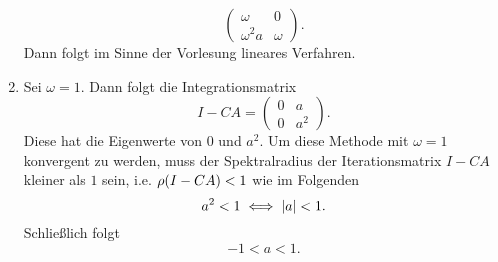\documentclass{exercise}
\begin{document}
\begin{enumerate}
\[\begin{pmatrix}
                \omega & 0\\
                \omega^2 a & \omega
            \end{pmatrix}.
        \]
        Dann folgt im Sinne der Vorlesung lineares Verfahren.
        \item Sei \(\omega = 1\).
        Dann folgt die Integrationsmatrix
        \[
            I - CA = \begin{pmatrix}
                0 & a\\
                0 & a^2
            \end{pmatrix}.
        \]
        Diese hat die Eigenwerte von \(0\) und \(a^2\).
        Um diese Methode mit \(\omega = 1\) konvergent zu werden, muss der Spektralradius der Iterationsmatrix \(I - CA\) kleiner als \(1\) sein, i.e. \(\rho\parentheses*{I - CA} < 1\) wie im Folgenden
        \[
            a^2 < 1 \iff \absolute*{a} < 1.
        \]
        Schließlich folgt
        \[
            -1 < a < 1.
        \]
    \end{enumerate}
\end{document}
